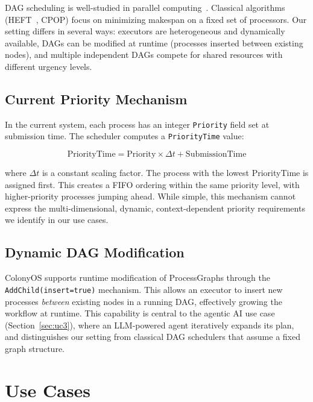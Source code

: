 \documentclass[conference]{IEEEtran}
\begin{document}
DAG scheduling is well-studied in parallel computing~\cite{kwok1999static}. Classical algorithms (HEFT~\cite{topcuoglu2002performance}, CPOP) focus on minimizing makespan on a fixed set of processors. Our setting differs in several ways: executors are heterogeneous and dynamically available, DAGs can be modified at runtime (processes inserted between existing nodes), and multiple independent DAGs compete for shared resources with different urgency levels.

\subsection{Current Priority Mechanism}

In the current system, each process has an integer \texttt{Priority} field set at submission time. The scheduler computes a \texttt{PriorityTime} value:

\begin{equation}
    \text{PriorityTime} = \text{Priority} \times \Delta t + \text{SubmissionTime}
\end{equation}

where $\Delta t$ is a constant scaling factor. The process with the lowest PriorityTime is assigned first. This creates a FIFO ordering within the same priority level, with higher-priority processes jumping ahead. While simple, this mechanism cannot express the multi-dimensional, dynamic, context-dependent priority requirements we identify in our use cases.

\subsection{Dynamic DAG Modification}

ColonyOS supports runtime modification of ProcessGraphs through the \texttt{AddChild(insert=true)} mechanism. This allows an executor to insert new processes \emph{between} existing nodes in a running DAG, effectively growing the workflow at runtime. This capability is central to the agentic AI use case (Section~\ref{sec:uc3}), where an LLM-powered agent iteratively expands its plan, and distinguishes our setting from classical DAG schedulers that assume a fixed graph structure.

\section{Use Cases}
\label{sec:usecases}
\end{document}
